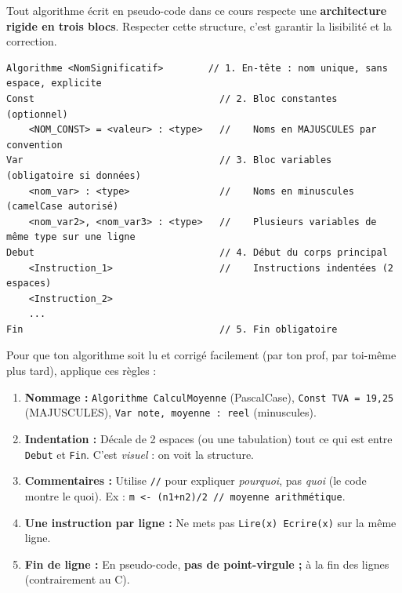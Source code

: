 \documentclass[11pt]{article}
\begin{document}
Tout algorithme écrit en pseudo-code dans ce cours respecte une \textbf{architecture rigide en trois blocs}. Respecter cette structure, c'est garantir la lisibilité et la correction.

\begin{propriete}
\begin{lstlisting}
Algorithme <NomSignificatif>        // 1. En-tête : nom unique, sans espace, explicite
Const                                 // 2. Bloc constantes (optionnel)
    <NOM_CONST> = <valeur> : <type>   //    Noms en MAJUSCULES par convention
Var                                   // 3. Bloc variables (obligatoire si données)
    <nom_var> : <type>                //    Noms en minuscules (camelCase autorisé)
    <nom_var2>, <nom_var3> : <type>   //    Plusieurs variables de même type sur une ligne
Debut                                 // 4. Début du corps principal
    <Instruction_1>                   //    Instructions indentées (2 espaces)
    <Instruction_2>
    ...
Fin                                   // 5. Fin obligatoire
\end{lstlisting}
\end{propriete}

\begin{methode}
Pour que ton algorithme soit lu et corrigé facilement (par ton prof, par toi-même plus tard), applique ces règles :
\begin{enumerate}
\item \textbf{Nommage :} \texttt{Algorithme CalculMoyenne} (PascalCase), \texttt{Const TVA = 19,25} (MAJUSCULES), \texttt{Var note, moyenne : reel} (minuscules).
\item \textbf{Indentation :} Décale de 2 espaces (ou une tabulation) tout ce qui est entre \texttt{Debut} et \texttt{Fin}. C'est \emph{visuel} : on voit la structure.
\item \textbf{Commentaires :} Utilise \texttt{//} pour expliquer \emph{pourquoi}, pas \emph{quoi} (le code montre le quoi). Ex : \texttt{m <- (n1+n2)/2 // moyenne arithmétique}.
\item \textbf{Une instruction par ligne :} Ne mets pas \texttt{Lire(x) Ecrire(x)} sur la même ligne.
\item \textbf{Fin de ligne :} En pseudo-code, \textbf{pas de point-virgule ;} à la fin des lignes (contrairement au C).
\end{enumerate}
\end{methode}
\end{document}
